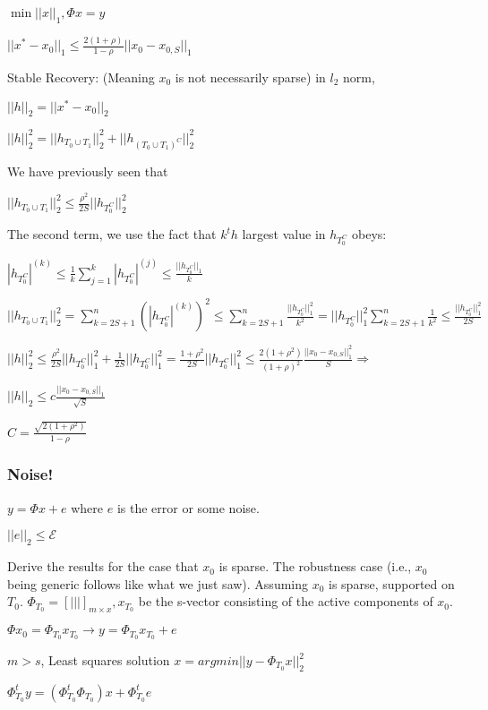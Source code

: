 \documentclass[12pt,letterpaper]{report}
\begin{document}
$\min ||x||_1, \Phi x = y$

$||x^* - x_0||_1 \leq \frac{2(1+\rho)}{1-\rho}||x_0 - x_{0,S}||_1$

Stable Recovery: (Meaning $x_0$ is not necessarily sparse) in $l_2$ norm, 

$||h||_2 = ||x^* - x_0||_2$

$||h||_2^2 = ||h_{T_0 \cup T_1}||_2^2 + ||h_{(T_0 \cup T_1)^C}||_2^2$

We have previously seen that

$||h_{T_0 \cup T_1}||_2^2 \leq \frac{\rho^2}{2S}||h_{T_0^C}||_2^2$

The second term, we use the fact that $k^th$ largest value in $h_{T_0^C}$ obeys: 

$|h_{T_0^C}|^{(k)} \leq \frac{1}{k} \sum_{j=1}^k |h_{T_0^C}|^{(j)} \leq \frac{||h_{T_0^C}||_1}{k}$

$||h_{T_0 \cup T_1}||_2^2 = \sum\limits_{k=2S+1}^n (|h_{T_0^C}|^{(k)})^2 \leq \sum\limits_{k = 2S+1}^n \frac{||h_{T_0^C}||_1^2}{k^2} = ||h_{T_0^C}||_1^2 \sum\limits_{k=2S+1}^n \frac{1}{k^2	} \leq \frac{||h_{T_0^C}||_1^2}{2S}$

$||h||_2^2 \leq \frac{\rho^2}{2S}||h_{T_0^C}||_1^2 + \frac{1}{2S}||h_{T_0^C}||_1^2 = \frac{1 + \rho^2}{2S}||h_{T_0^C}||_1^2 \leq \frac{2(1 + \rho^2)}{(1+\rho)^2} \frac{||x_0 - x_{0,S}||_1^2}{S} \Rightarrow$

$||h||_2 \leq c \frac{||x_0 - x_{0,S}||_1}{\sqrt{S}}$

$C = \frac{\sqrt{2(1+\rho^2)}}{1-\rho}$

\subsubsection*{Noise!}

$y = \Phi x + e$ where $e$ is the error or some noise.

$||e||_2 \leq \mathcal{E}$

Derive the results for the case that $x_0$ is sparse.  The robustness case (i.e., $x_0$ being generic follows like what we just saw).  Assuming $x_0$ is sparse, supported on $T_0$.  $\Phi_{T_0} = [|||]_{m \times x}, x_{T_0}$ be the s-vector consisting of the active components of $x_0$.

$\Phi x_0 = \Phi_{T_0} x_{T_0} \rightarrow y = \Phi_{T_0} x_{T_0} + e$

$m > s$, Least squares solution $x = argmin ||y - \Phi_{T_0} x||_2^2$

$\Phi_{T_0}^t y = (\Phi_{T_0}^t \Phi_{T_0})x + \Phi_{T_0}^t e$
\end{document}
